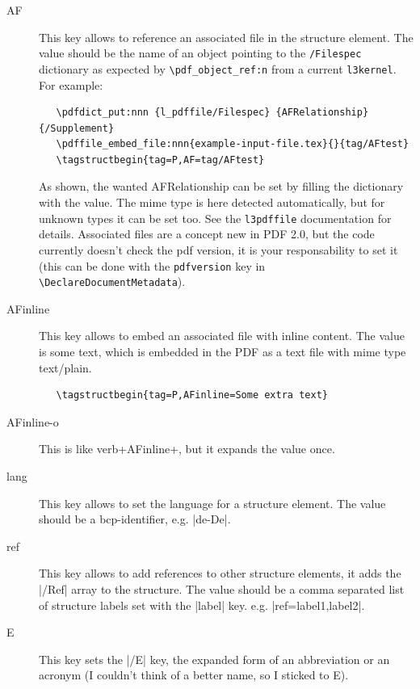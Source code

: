 \documentclass[DIV=12,parskip=half-,bibliography=totoc]{scrartcl}
\newcommand\PrintKeyName[1]{\textsf{#1}}
\begin{document}
\begin{description}
   \item[\PrintKeyName{AF}]
   This key allows to reference an associated file in the structure element.
   The value should be the name of an object pointing to the \texttt{/Filespec} dictionary as expected by
   \verb+\pdf_object_ref:n+ from a current \texttt{l3kernel}.
   For example:

   \begin{lstlisting}
   \pdfdict_put:nnn {l_pdffile/Filespec} {AFRelationship}{/Supplement}
   \pdffile_embed_file:nnn{example-input-file.tex}{}{tag/AFtest}
   \tagstructbegin{tag=P,AF=tag/AFtest}
   \end{lstlisting}

   As shown, the wanted AFRelationship can be set
   by filling the dictionary with the value. The mime type
   is here detected automatically, but for unknown types it can be set too.
   See the \texttt{l3pdffile} documentation for details.  Associated files are
   a concept new in PDF 2.0, but the code currently doesn't check the pdf version, it is your responsability
   to set it (this can be done with the \texttt{pdfversion} key in \verb+\DeclareDocumentMetadata+).

   \item[\PrintKeyName{AFinline}]
    This key allows to embed an associated file with inline content. The value is some text,
    which is embedded in the PDF as a text file with mime type text/plain.

   \begin{lstlisting}
   \tagstructbegin{tag=P,AFinline=Some extra text}
   \end{lstlisting}

   \item[\PrintKeyName{AFinline-o}]
    This is like verb+AFinline+, but it expands the value once.

   \item[\PrintKeyName{lang}]
     This key allows to set the language for a structure element. The value should be a bcp-identifier,
     e.g. |de-De|.

   \item[\PrintKeyName{ref}]
     This key allows to add references to other structure elements, it adds the |/Ref| array to the structure.
       The value should be a comma separated list of structure labels set with the |label| key.
     e.g. |ref={label1,label2}|.

   \item[\PrintKeyName{E}]
     This key sets the |/E| key, the expanded form of an abbreviation or an acronym (I couldn't think of a better name, so I sticked to E).
\end{description}
\end{document}
